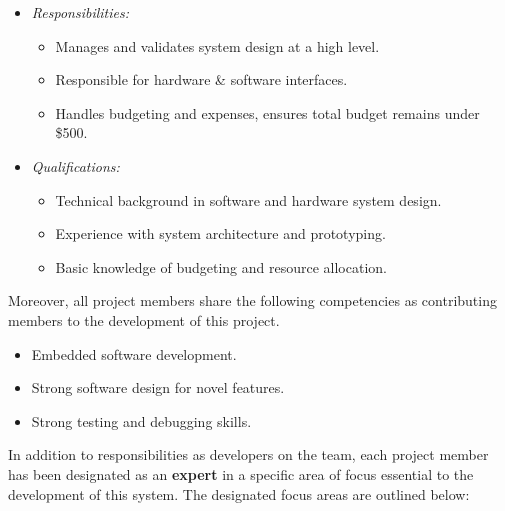 \documentclass[12pt]{article}
\theoremstyle{definition}
\begin{document}
\begin{itemize}
\begin{itemize}
      \item \textit{Responsibilities:}
        \begin{itemize}
          \item Manages and validates system design at a high level. 
          \item Responsible for hardware \& software interfaces.
          \item Handles budgeting and expenses, ensures total budget remains 
          under \$500.
        \end{itemize}
      \item \textit{Qualifications:}
        \begin{itemize}
          \item Technical background in software and hardware system design. 
          \item Experience with system architecture and prototyping.  
          \item Basic knowledge of budgeting and resource allocation. 
        \end{itemize}
    \end{itemize}
\end{itemize}


Moreover, all project members share the following competencies as contributing 
members to the development of this project. 
\begin{itemize}
  \item Embedded software development.
  \item Strong software design for novel features. 
  \item Strong testing and debugging skills. 
\end{itemize}

In addition to responsibilities as developers on the team, each project member 
has been designated as an \textbf{expert} in a specific area of focus essential 
to the development of this system. 
The designated focus areas are outlined below:
\end{document}
